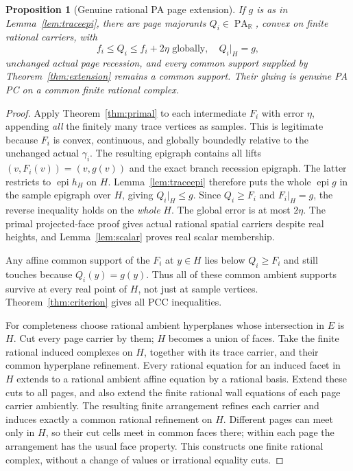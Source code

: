 \documentclass[11pt]{article}
\newtheorem{proposition}[theorem]{Proposition}
\newcommand{\R}{\mathbb R}
\newcommand{\PA}{\operatorname{PA}}
\newcommand{\epi}{\operatorname{epi}}
\begin{document}
\begin{proposition}[Genuine rational PA page extension]\label{prop:PAextension}
If $g$ is as in Lemma~\ref{lem:traceepi}, there are page majorants $Q_i\in\PA_\R$, convex on finite rational carriers, with
\[
 f_i\leq Q_i\leq f_i+2\eta\text{ globally},\quad Q_i|_H=g,
\]
unchanged actual page recession, and every common support supplied by Theorem~\ref{thm:extension} remains a common support. Their gluing is genuine PA PC on a common finite rational complex.
\end{proposition}
\begin{proof}
Apply Theorem~\ref{thm:primal} to each intermediate $F_i$ with error $\eta$, appending \emph{all} the finitely many trace vertices as samples. This is legitimate because $F_i$ is convex, continuous, and globally boundedly relative to the unchanged actual $\gamma_i$. The resulting epigraph contains all lifts $(v,F_i(v))=(v,g(v))$ and the exact branch recession epigraph. The latter restricts to $\epi h_H$ on $H$. Lemma~\ref{lem:traceepi} therefore puts the whole $\epi g$ in the sample epigraph over $H$, giving $Q_i|_H\leq g$. Since $Q_i\geq F_i$ and $F_i|_H=g$, the reverse inequality holds on the \emph{whole} $H$. The global error is at most $2\eta$. The primal projected-face proof gives actual rational spatial carriers despite real heights, and Lemma~\ref{lem:scalar} proves real scalar membership.

Any affine common support of the $F_i$ at $y\in H$ lies below $Q_i\geq F_i$ and still touches because $Q_i(y)=g(y)$. Thus all of these common ambient supports survive at every real point of $H$, not just at sample vertices. Theorem~\ref{thm:criterion} gives all PCC inequalities.

For completeness choose rational ambient hyperplanes whose intersection in $E$ is $H$. Cut every page carrier by them; $H$ becomes a union of faces. Take the finite rational induced complexes on $H$, together with its trace carrier, and their common hyperplane refinement. Every rational equation for an induced facet in $H$ extends to a rational ambient affine equation by a rational basis. Extend these cuts to all pages, and also extend the finite rational wall equations of each page carrier ambiently. The resulting finite arrangement refines each carrier and induces exactly a common rational refinement on $H$. Different pages can meet only in $H$, so their cut cells meet in common faces there; within each page the arrangement has the usual face property. This constructs one finite rational complex, without a change of values or irrational equality cuts.
\end{proof}
\end{document}
